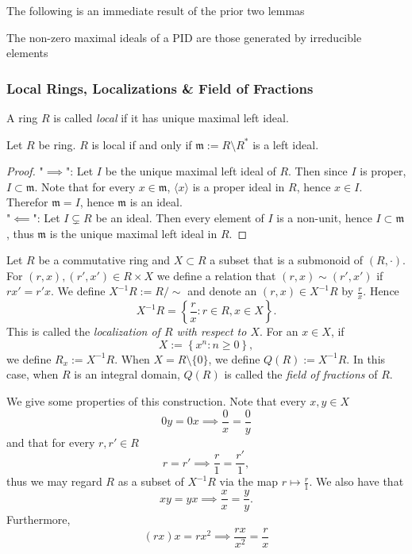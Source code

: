     The following is an immediate result of the prior two lemmas
    \begin{corollary}\label{MaximalIdealsAreThoseGeneratedByIrreducibleElements}
        The non-zero maximal ideals of a PID are those generated by irreducible elements 
    \end{corollary}
\subsubsection{Local Rings, Localizations \& Field of Fractions}
\begin{definition}
    A ring $R$ is called \textit{local} if it has unique maximal left ideal. 
\end{definition}
\begin{proposition}\label{EquivalentFormulationOfRingBeingLocal}
    Let $R$ be ring. $R$ is local if and only if $\mathfrak{m}:=R\setminus R^\ast$ is a left ideal.
\end{proposition}
\begin{proof}
    "$\implies$": Let $I$ be the unique maximal left ideal of $R$. Then since $I$ is proper, $I\subset \mathfrak{m}$. Note that for every $x\in \mathfrak{m}$, $\langle x\rangle$ is a proper ideal in $R$, hence $x\in I$. Therefor $\mathfrak{m} = I$, hence $\mathfrak{m}$ is an ideal.\\
    "$\impliedby$": Let $I\subsetneq R$ be an ideal. Then every element of $I$ is a non-unit, hence $I\subset \mathfrak{m}$, thus $\mathfrak{m}$ is the unique maximal left ideal in $R$.
\end{proof}
\begin{definition}
    Let $R$ be a commutative ring and $X\subset R$ a subset that is a submonoid of $(R,\cdot)$. For $(r,x),(r',x')\in R\times X$ we define a relation that $(r,x)\sim (r',x')$ if $rx' = r'x$. We define $X^{-1}R := R/\sim$ and denote an $(r,x)\in X^{-1}R$ by $\frac{r}{x}$. Hence 
    $$X^{-1}R = \left\{\frac{r}{x} : r \in R, x\in X \right\}.$$
    This is called the \textit{localization of $R$ with respect to $X$}. For an $x\in X$, if 
    $$X:= \left\{x^n : n\geq 0\right\},$$
    we define $R_x := X^{-1}R$. When $X = R\setminus \{0\}$, we define $Q(R) := X^{-1}R$. In this case, when $R$ is an integral domain, $Q(R)$ is called the \textit{field of fractions} of $R$.
\end{definition}
\begin{remark}
    We give some properties of this construction. Note that every $x,y \in X$
    $$0y = 0x \implies \frac{0}{x} = \frac{0}{y}$$
    and that for every $r,r'\in R$
    $$r = r' \implies \frac{r}{1} = \frac{r'}{1},$$
    thus we may regard $R$ as a subset of $X^{-1}R$ via the map $r \mapsto \frac{r}{1}$. We also have that  
    $$xy = yx \implies \frac{x}{x} = \frac{y}{y}.$$
    Furthermore,
    $$(rx)x= rx^2  \implies \frac{rx}{x^2} = \frac{r}{x}$$
\end{remark}
